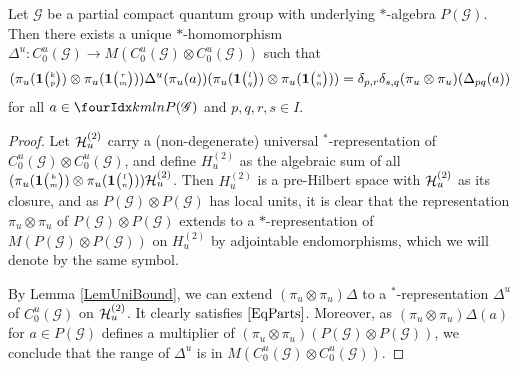 \begin{Prop}
Let $\mathscr{G}$ be a partial compact quantum group with underlying
$*$-algebra $P(\mathscr{G})$. Then  there exists a unique $*$-homomorphism $\Delta^{u}\colon
  C^{u}_{0}(\mathscr{G}) \to M(C^{u}_{0}(\mathscr{G}) \otimes
  C^{u}_{0}(\mathscr{G}))$ such that 
  \begin{equation}\label{EqParts}
    (\pi_u(\mathbf{1}{\tiny {\begin{pmatrix} k\\p\end{pmatrix}}}) \otimes
    \pi_u(\mathbf{1}{\tiny {\begin{pmatrix} r\\m\end{pmatrix}}}))\Delta^{u}(\pi_{u}(a))(\pi_u(\mathbf{1}{\tiny {\begin{pmatrix} l\\q\end{pmatrix}}})\otimes \pi_u(\mathbf{1}{\tiny {\begin{pmatrix} s\\n\end{pmatrix}}})) =\delta_{p,r}\delta_{s,q}
    (\pi_{u}  \otimes \pi_{u})(\Delta_{pq}(a))
  \end{equation}
  for all $a \in \Gr{P(\mathscr{G})}{k}{l}{m}{n}$ and $p,q,r,s\in I$.
\end{Prop}
\begin{proof}

Let $\mathcal{H}_u^{(2)}$ carry a (non-degenerate) universal $^*$-representation of $C_0^u(\mathscr{G})\otimes C_0^u(\mathscr{G})$, and define $H_u^{(2)}$ as the algebraic sum of all $(\pi_u(\mathbf{1}{\tiny {\begin{pmatrix} k\\m\end{pmatrix}}}) \otimes \pi_u(\mathbf{1}{\tiny {\begin{pmatrix} l\\n\end{pmatrix}}}))\mathcal{H}_u^{(2)}$. Then $H_u^{(2)}$ is a pre-Hilbert space with $\mathcal{H}_u^{(2)}$ as its closure, and as $P(\mathscr{G})\otimes P(\mathscr{G})$ has local units, it is clear that the representation $\pi_u\otimes \pi_u$ of $P(\mathscr{G})\otimes P(\mathscr{G})$ extends to a $ *$-representation of $M(P(\mathscr{G})\otimes P(\mathscr{G}))$ on $H_u^{(2)}$ by adjointable endomorphisms, which we will denote by the same symbol.

By Lemma \ref{LemUniBound}, we can extend $(\pi_u\otimes \pi_u)\Delta$ to a $^*$-representation $\Delta^u$ of $C_0^u(\mathscr{G})$ on $\mathcal{H}_u^{(2)}$. It clearly satisfies $\eqref{EqParts}$. Moreover, as $(\pi_u\otimes \pi_u)\Delta(a)$ for $a\in P(\mathscr{G})$ defines a multiplier of $(\pi_u\otimes \pi_u)(P(\mathscr{G})\otimes P(\mathscr{G}))$, we conclude that the range of $\Delta^u$ is in $M(C_0^u(\mathscr{G})\otimes C_0^u(\mathscr{G}))$.
\end{proof}


